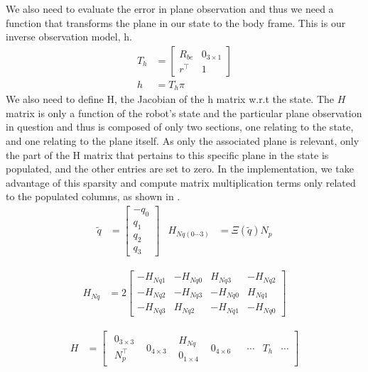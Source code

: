 \documentclass[]{article}
\begin{document}
{We also need to evaluate the error in plane observation and thus we need a function that transforms the plane in our state to the body frame. This is our inverse observation model, h.
\begin{align}
	T_h &= 
	\left[
	\begin{matrix}
		R_{be} 	& 0_{3\times1} \\
		r^\top 	& 1
	\end{matrix}
	\right]
	\\
	h &= T_h \pi
\end{align}
We also need to define H, the Jacobian of the h matrix w.r.t the state. The $H$ matrix is only a function of the robot's state and the particular plane observation in question and thus is composed of only two sections, one relating to the state, and one relating to the plane itself. As only the associated plane is relevant, only the part of the H matrix that pertains to this specific plane in the state is populated, and the other entries are set to zero.
In the implementation, we take advantage of this sparsity and compute matrix multiplication terms only related to the populated columns, as shown in \cite{Sola2013}.
\begin{align}
	\tilde{q} &= 
	\left[
	\begin{matrix}
		-q_0 \\
		q_1 \\
		q_2 \\
		q_3
	\end{matrix}
	\right]
	&
	H_{Nq(0\cdots3)} &= \Xi(\tilde{q}) N_p
\end{align}

\begin{align}
	H_{Nq} &= 2
	\left[
	\begin{matrix}
		-H_{Nq1} 	& -H_{Nq0} 	& H_{Nq3} 	& -H_{Nq2} \\
		-H_{Nq2} 	& -H_{Nq3} 	& -H_{Nq0} 	& H_{Nq1} \\
		-H_{Nq3} 	& H_{Nq2} 	& -H_{Nq1} 	& -H_{Nq0}
	\end{matrix}
	\right]
\end{align}

\begin{align}
	\label{eqn:H}
	H &=
	\left[
	\begin{matrix}
		\begin{matrix}
			0_{3 \times 3} \\
			N_p^\top
		\end{matrix}
		& 0_{4 \times 3}
		&
		\begin{matrix}
			H_{Nq} \\
			0_{1 \times 4}
		\end{matrix}
		& 0_{4 \times 6}
		&
		& \cdots
		& T_h
		& \cdots
	\end{matrix}
	\right]
\end{align}

}
\end{document}

